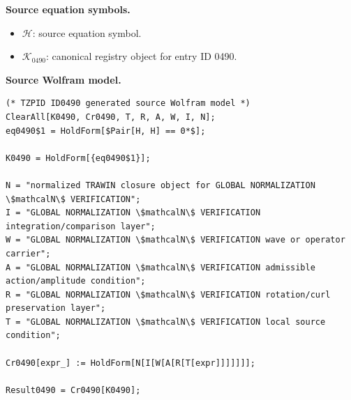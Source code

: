 \begin{minipage}[t]{0.49\linewidth}
\begingroup
\small
\raggedright
\textbf{Source equation symbols.}\par
\begin{itemize}[leftmargin=1.35em,itemsep=1pt,topsep=1pt,parsep=0pt]
    \item $\mathcal{H}$: source equation symbol.
    \item $\mathcal{K}_{0490}$: canonical registry object for entry ID 0490.
\end{itemize}
\endgroup
\end{minipage}\hfill
\begin{minipage}[t]{0.47\linewidth}
\begingroup
\scriptsize
\raggedright
\textbf{Source Wolfram model.}\par
\begin{Verbatim}[fontsize=\tiny,breaklines=true,breakanywhere=true]
(* TZPID ID0490 generated source Wolfram model *)
ClearAll[K0490, Cr0490, T, R, A, W, I, N];
eq0490$1 = HoldForm[$Pair[H, H] == 0*$];

K0490 = HoldForm[{eq0490$1}];

N = "normalized TRAWIN closure object for GLOBAL NORMALIZATION \$mathcalN\$ VERIFICATION";
I = "GLOBAL NORMALIZATION \$mathcalN\$ VERIFICATION integration/comparison layer";
W = "GLOBAL NORMALIZATION \$mathcalN\$ VERIFICATION wave or operator carrier";
A = "GLOBAL NORMALIZATION \$mathcalN\$ VERIFICATION admissible action/amplitude condition";
R = "GLOBAL NORMALIZATION \$mathcalN\$ VERIFICATION rotation/curl preservation layer";
T = "GLOBAL NORMALIZATION \$mathcalN\$ VERIFICATION local source condition";

Cr0490[expr_] := HoldForm[N[I[W[A[R[T[expr]]]]]]];

Result0490 = Cr0490[K0490];
\end{Verbatim}
\endgroup
\end{minipage}

